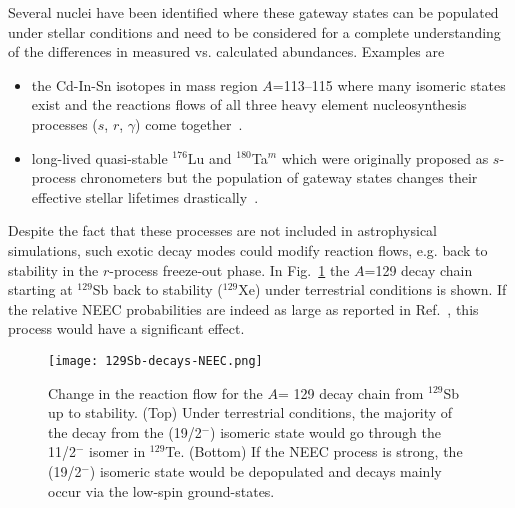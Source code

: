 \documentclass[cnatzke_thesis_proposal.tex]{subfiles}
\begin{document}
    Several nuclei have been identified where these gateway states can be populated under stellar conditions and need to be considered for a complete understanding of the differences in measured vs. calculated abundances.
    Examples are
    \begin{itemize}
        \item the Cd-In-Sn isotopes in mass region $A$=113--115 where many isomeric states exist and the reactions flows of all three heavy element nucleosynthesis processes ($s$, $r$, $\gamma$) come together~\cite{Nem94}.
        \vspace{-10pt}
        \item long-lived quasi-stable $^{176}$Lu and $^{180}$Ta$^m$ which were originally proposed as $s$-process chronometers but the population of gateway states changes their effective stellar lifetimes drastically~\cite{Car89}.
    \end{itemize}



    Despite the fact that these processes are not included in astrophysical simulations, such exotic decay modes could modify reaction flows, e.g. back to stability in the $r$-process freeze-out phase.
    In Fig.~\ref{A129-decay} the $A$=129 decay chain starting at $^{129}$Sb back to stability ($^{129}$Xe) under terrestrial conditions is shown.
    If the relative NEEC probabilities are indeed as large as reported in Ref.~\cite{Chiara2018}, this process would have a significant effect.

    \begin{figure}[H]
        \centering
        \texttt{[image: 129Sb-decays-NEEC.png]}
        \caption{\label{A129-decay}\small{Change in the reaction flow for the $A$= 129 decay chain from $^{129}$Sb up to stability. (Top) Under terrestrial conditions, the majority of the decay from the (19/2$^-$) isomeric state would go through the 11/2$^-$ isomer in $^{129}$Te. (Bottom) If the NEEC process is strong, the (19/2$^-$) isomeric state would be depopulated and decays mainly occur via the low-spin ground-states.} \cite{eec_SOP_NEEC}}
    \end{figure}
\end{document}
